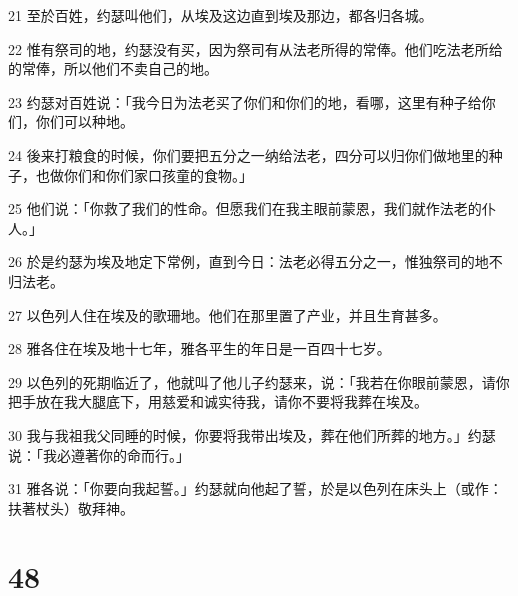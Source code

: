 \par 21 至於百姓，约瑟叫他们，从埃及这边直到埃及那边，都各归各城。
\par 22 惟有祭司的地，约瑟没有买，因为祭司有从法老所得的常俸。他们吃法老所给的常俸，所以他们不卖自己的地。
\par 23 约瑟对百姓说：「我今日为法老买了你们和你们的地，看哪，这里有种子给你们，你们可以种地。
\par 24 後来打粮食的时候，你们要把五分之一纳给法老，四分可以归你们做地里的种子，也做你们和你们家口孩童的食物。」
\par 25 他们说：「你救了我们的性命。但愿我们在我主眼前蒙恩，我们就作法老的仆人。」
\par 26 於是约瑟为埃及地定下常例，直到今日：法老必得五分之一，惟独祭司的地不归法老。
\par 27 以色列人住在埃及的歌珊地。他们在那里置了产业，并且生育甚多。
\par 28 雅各住在埃及地十七年，雅各平生的年日是一百四十七岁。
\par 29 以色列的死期临近了，他就叫了他儿子约瑟来，说：「我若在你眼前蒙恩，请你把手放在我大腿底下，用慈爱和诚实待我，请你不要将我葬在埃及。
\par 30 我与我祖我父同睡的时候，你要将我带出埃及，葬在他们所葬的地方。」约瑟说：「我必遵著你的命而行。」
\par 31 雅各说：「你要向我起誓。」约瑟就向他起了誓，於是以色列在床头上（或作：扶著杖头）敬拜神。

\chapter{48}

